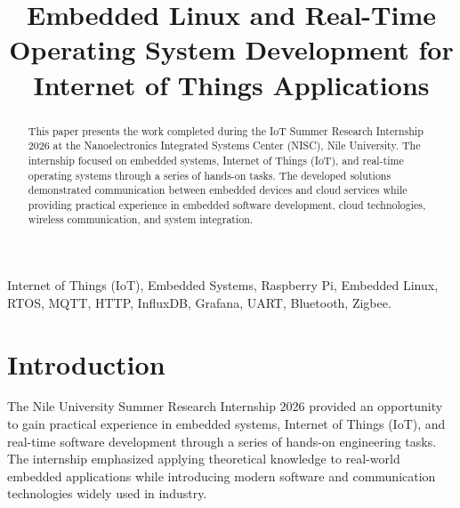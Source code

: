 \documentclass[conference]{IEEEtran}
\begin{document}
\title{Embedded Linux and Real-Time Operating System Development for Internet of Things Applications}


\author{

}

\maketitle

\begin{abstract}
This paper presents the work completed during the IoT Summer Research Internship 2026 at the Nanoelectronics Integrated Systems Center (NISC), Nile University. The internship focused on embedded systems, Internet of Things (IoT), and real-time operating systems through a series of hands-on tasks. The developed solutions demonstrated communication between embedded devices and cloud services while providing practical experience in embedded software development, cloud technologies, wireless communication, and system integration.
\end{abstract}


\begin{IEEEkeywords}
Internet of Things (IoT), Embedded Systems, Raspberry Pi, Embedded Linux, RTOS, MQTT, HTTP, InfluxDB, Grafana, UART, Bluetooth, Zigbee.
\end{IEEEkeywords}


\section{Introduction}

The Nile University Summer Research Internship 2026 provided an opportunity to gain practical experience in embedded systems, Internet of Things (IoT), and real-time software development through a series of hands-on engineering tasks. The internship emphasized applying theoretical knowledge to real-world embedded applications while introducing modern software and communication technologies widely used in industry.
\end{document}
